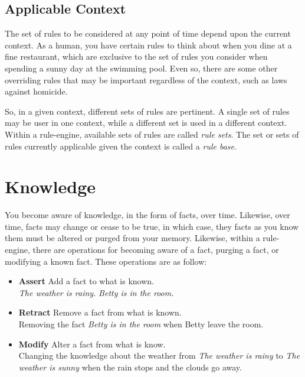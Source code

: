 \subsection{Applicable Context}

The set of rules to be considered at any point of time depend upon the
current context.  As a human, you have certain rules to think about
when you dine at a fine restaurant, which are exclusive to the set of
rules you consider when spending a sunny day at the swimming pool.
Even so, there are some other overriding rules that may be important
regardless of the context, such as laws against homicide.

So, in a given context, different sets of rules are pertinent.  A
single set of rules may be user in one context, while a different set
is used in a different context. Within a rule-engine, available sets 
of rules are called \emph{rule sets}.  The set or 
sets of rules currently applicable given the context is called a 
\emph{rule base}.

\section{Knowledge}

You become aware of knowledge, in the form of facts, over time.
Likewise, over time, facts may change or cease to be true, in 
which case, they facts as you know them must be altered or purged
from your memory.  Likewise, within a rule-engine, there are
operations for becoming aware of a fact, purging a fact, or
modifying a known fact.  These operations are as follow:

\begin{itemize}
  \item \textbf{Assert} Add a fact to what is known.\\
    \emph{The weather is rainy.} \emph{Betty is in the room.}
  \item \textbf{Retract} Remove a fact from what is known.\\
    Removing the fact \emph{Betty is in the room} when Betty leave the
    room.
  \item \textbf{Modify} Alter a fact from what is know.\\
    Changing the knowledge about the weather from \emph{The weather is
    rainy} to \emph{The weather is sunny} when the rain stops and the
    clouds go away.
\end{itemize}

